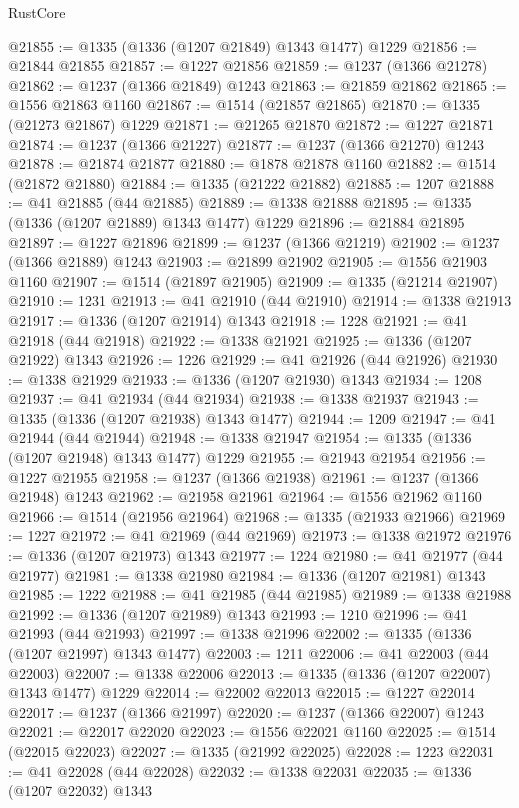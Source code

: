 \begin{lexlean}{RustCore}
\begin{coremodule}
@21855 := @1335 (@1336 (@1207 @21849) @1343 @1477) @1229
@21856 := @21844 @21855
@21857 := @1227 @21856
@21859 := @1237 (@1366 @21278)
@21862 := @1237 (@1366 @21849) @1243
@21863 := @21859 @21862
@21865 := @1556 @21863 @1160
@21867 := @1514 (@21857 @21865)
@21870 := @1335 (@21273 @21867) @1229
@21871 := @21265 @21870
@21872 := @1227 @21871
@21874 := @1237 (@1366 @21227)
@21877 := @1237 (@1366 @21270) @1243
@21878 := @21874 @21877
@21880 := @1878 @21878 @1160
@21882 := @1514 (@21872 @21880)
@21884 := @1335 (@21222 @21882)
@21885 := 1207
@21888 := @41 @21885 (@44 @21885)
@21889 := @1338 @21888
@21895 := @1335 (@1336 (@1207 @21889) @1343 @1477) @1229
@21896 := @21884 @21895
@21897 := @1227 @21896
@21899 := @1237 (@1366 @21219)
@21902 := @1237 (@1366 @21889) @1243
@21903 := @21899 @21902
@21905 := @1556 @21903 @1160
@21907 := @1514 (@21897 @21905)
@21909 := @1335 (@21214 @21907)
@21910 := 1231
@21913 := @41 @21910 (@44 @21910)
@21914 := @1338 @21913
@21917 := @1336 (@1207 @21914) @1343
@21918 := 1228
@21921 := @41 @21918 (@44 @21918)
@21922 := @1338 @21921
@21925 := @1336 (@1207 @21922) @1343
@21926 := 1226
@21929 := @41 @21926 (@44 @21926)
@21930 := @1338 @21929
@21933 := @1336 (@1207 @21930) @1343
@21934 := 1208
@21937 := @41 @21934 (@44 @21934)
@21938 := @1338 @21937
@21943 := @1335 (@1336 (@1207 @21938) @1343 @1477)
@21944 := 1209
@21947 := @41 @21944 (@44 @21944)
@21948 := @1338 @21947
@21954 := @1335 (@1336 (@1207 @21948) @1343 @1477) @1229
@21955 := @21943 @21954
@21956 := @1227 @21955
@21958 := @1237 (@1366 @21938)
@21961 := @1237 (@1366 @21948) @1243
@21962 := @21958 @21961
@21964 := @1556 @21962 @1160
@21966 := @1514 (@21956 @21964)
@21968 := @1335 (@21933 @21966)
@21969 := 1227
@21972 := @41 @21969 (@44 @21969)
@21973 := @1338 @21972
@21976 := @1336 (@1207 @21973) @1343
@21977 := 1224
@21980 := @41 @21977 (@44 @21977)
@21981 := @1338 @21980
@21984 := @1336 (@1207 @21981) @1343
@21985 := 1222
@21988 := @41 @21985 (@44 @21985)
@21989 := @1338 @21988
@21992 := @1336 (@1207 @21989) @1343
@21993 := 1210
@21996 := @41 @21993 (@44 @21993)
@21997 := @1338 @21996
@22002 := @1335 (@1336 (@1207 @21997) @1343 @1477)
@22003 := 1211
@22006 := @41 @22003 (@44 @22003)
@22007 := @1338 @22006
@22013 := @1335 (@1336 (@1207 @22007) @1343 @1477) @1229
@22014 := @22002 @22013
@22015 := @1227 @22014
@22017 := @1237 (@1366 @21997)
@22020 := @1237 (@1366 @22007) @1243
@22021 := @22017 @22020
@22023 := @1556 @22021 @1160
@22025 := @1514 (@22015 @22023)
@22027 := @1335 (@21992 @22025)
@22028 := 1223
@22031 := @41 @22028 (@44 @22028)
@22032 := @1338 @22031
@22035 := @1336 (@1207 @22032) @1343

\end{coremodule}
\end{lexlean}
